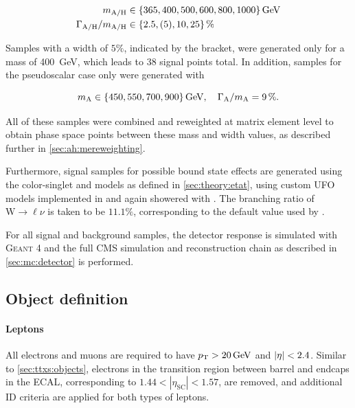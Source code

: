 \begin{equation}
\begin{split}
    m_{\AH} &\in \{ 365, 400, 500, 600, 800, 1000 \} \, \si{\GeV} \\
    \Gamma_{\AH} / m_{\AH} &\in \{ 2.5, (5), 10, 25 \} \, \%
\end{split}
\end{equation}

Samples with a width of $5\%$, indicated by the bracket, were generated only for a mass of \SI{400}{\GeV}, which leads to 38 signal points total. In addition, samples for the pseudoscalar case only were generated with

\begin{equation}
    \mA \in \{ 450, 550, 700, 900 \} \, \si{GeV}, \quad \wA / \mA = 9 \, \%.
\end{equation}

All of these samples were combined and reweighted at matrix element level to obtain phase space points between these mass and width values, as described further in \cref{sec:ah:mereweighting}.

Furthermore, signal samples for possible \ttbar bound state effects are generated using the color-singlet \etat and \chit models as defined in \cref{sec:theory:etat}, using custom UFO models implemented in \amcatnlo and again showered with \pythia.
The branching ratio of $\mathrm{W} \rightarrow \ell \nu$ is taken to be $11.1\%$, corresponding to the default value used by \amcatnlo.

For all signal and background samples, the detector response is simulated with \textsc{Geant 4} and the full CMS simulation and reconstruction chain as described in \cref{sec:mc:detector} is performed.

\subsection{Object definition}
\label{sec:ah:objects}

\paragraph{Leptons} 

All electrons and muons are required to have $\pt > \SI{20}{\GeV}$ and $\abseta < 2.4$. Similar to \cref{sec:ttxs:objects}, electrons in the transition region between barrel and endcaps in the ECAL, corresponding to $1.44 < |\eta_{\mathrm{SC}}| < 1.57$, are removed, and additional ID criteria are applied for both types of leptons.

